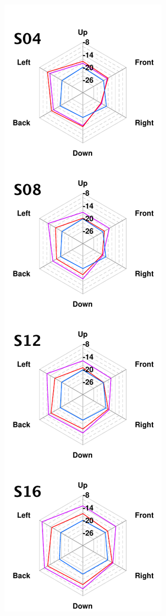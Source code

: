 \documentclass[11pt,a4j]{jreport}
\begin{document}
\begin{figure}[H]
\begin{minipage}{.5\linewidth}
    \includegraphics[scale=.77]{images/realHallDirSt/allPoint/reshaped/gLeftPage.pdf}
  \end{minipage}
\end{figure}
\end{document}
